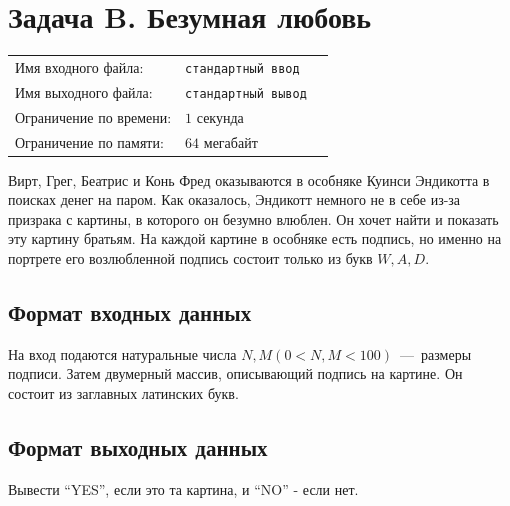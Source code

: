 \documentclass[12pt]{scrartcl}
\newcommand{\inputFile}{стандартный ввод}
\newcommand{\outputFile}{стандартный вывод}
\begin{document}
\newpage

\section*{Задача B. Безумная любовь }

\begin{tabularx}{\textwidth}{l l X}
    Имя входного файла: & \texttt{\inputFile} \\
    Имя выходного файла: & \texttt{\outputFile} \\
    Ограничение по времени: & $1$ секунда \\
    Ограничение по памяти: & $64$ мегабайт \\
\end{tabularx}

\begin{figure}[h]
\end{figure}

Вирт, Грег, Беатрис и Конь Фред оказываются в особняке Куинси Эндикотта в поисках денег на паром. Как оказалось, Эндикотт немного не в себе из-за призрака с картины, в которого он безумно влюблен. Он хочет найти и показать эту картину братьям. На каждой картине в особняке есть подпись, но именно на портрете его возлюбленной подпись состоит только из букв $W, A, D$.

\subsection*{Формат входных данных}
На вход подаются натуральные числа $N, M (0 < N, M < 100)$~---~размеры подписи. Затем двумерный массив, описывающий подпись на картине. Он состоит из заглавных латинских букв.
\subsection*{Формат выходных данных}
Вывести ``YES'', если это та картина, и ``NO'' - если нет.
\end{document}
